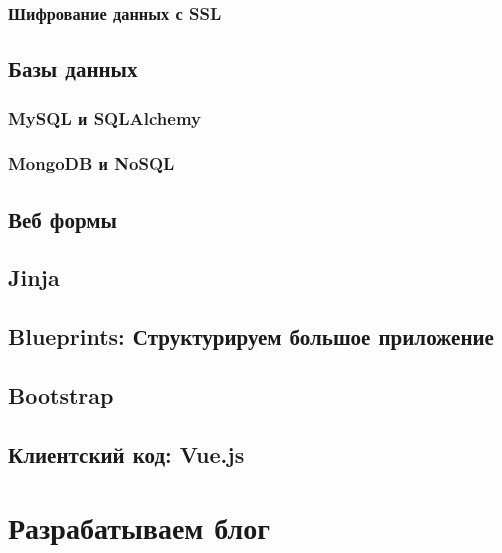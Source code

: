 \subsection{Шифрование данных с SSL}

\section{Базы данных}

\subsection{MySQL и SQLAlchemy}

\subsection{MongoDB и NoSQL}

\section{Веб формы}

\section{Jinja}

\section{Blueprints: Структурируем большое приложение}

\section{Bootstrap}

\section{Клиентский код: Vue.js}

\chapter{Разрабатываем блог}

